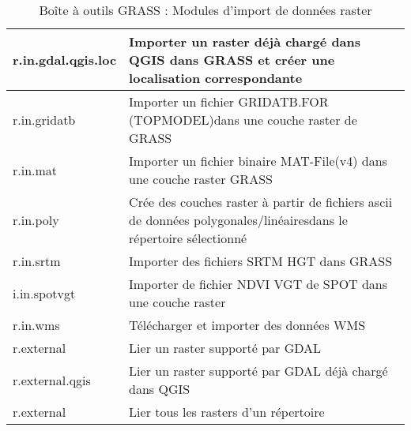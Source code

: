 \begin{table}[H]
\begin{tabular}{|p{3cm}|p{11cm}|}
  \hline r.in.gdal.qgis.loc & Importer un raster déjà chargé dans QGIS dans GRASS et créer une localisation correspondante \\
  \hline r.in.gridatb & Importer un fichier GRIDATB.FOR (TOPMODEL)dans une couche raster de GRASS\\
  \hline r.in.mat  & Importer un fichier binaire MAT-File(v4) dans une couche raster GRASS \\
  \hline r.in.poly  & Crée des couches raster à partir de fichiers ascii de données polygonales/linéairesdans le répertoire sélectionné \\
  \hline r.in.srtm  & Importer des fichiers SRTM HGT dans GRASS \\
  \hline i.in.spotvgt & Importer de fichier NDVI VGT de SPOT dans une couche raster \\
  \hline r.in.wms & Télécharger et importer des données WMS \\  
  \hline r.external & Lier un raster supporté par GDAL\\  
  \hline r.external.qgis & Lier un raster supporté par GDAL déjà chargé dans QGIS \\  
  \hline r.external & Lier tous les rasters d'un répertoire \\  
  \hline
\end{tabular}
\caption{Boîte à outils GRASS : Modules d'import de données raster}
\end{table}

